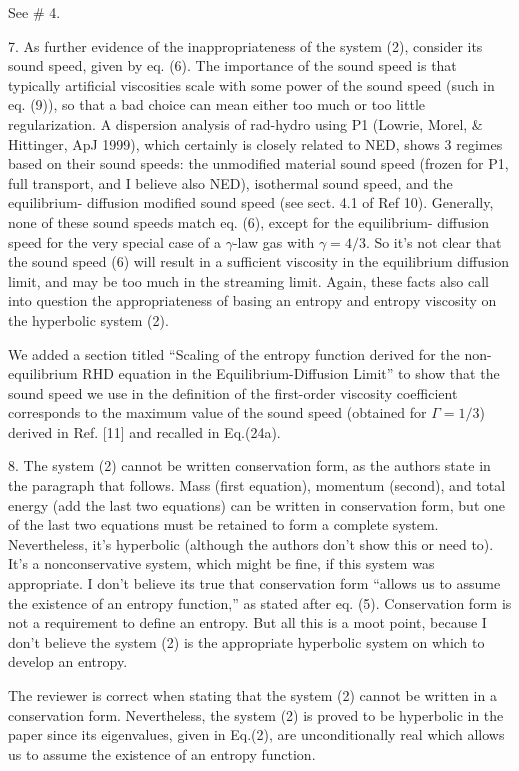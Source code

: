 \documentclass{article}
\begin{document}
See \# 4.
\bigskip


{
\color{blue}
7. As further evidence of the inappropriateness of the system (2), consider its sound speed, given by eq. (6). The importance of the sound speed is that typically artificial viscosities scale with some power of the sound speed (such in eq. (9)), so that a bad choice can mean either too much or too little regularization. A dispersion analysis of rad-hydro using P1 (Lowrie, Morel, \& Hittinger, ApJ 1999), which certainly is closely related to NED, shows 3 regimes based on their sound speeds: the unmodified material sound speed (frozen for P1, full transport, and I believe also NED), isothermal sound speed, and the equilibrium- diffusion modified sound speed (see sect. 4.1 of Ref 10). Generally, none of these sound speeds match eq. (6), except for the equilibrium- diffusion speed for the very special case of a $\gamma$-law gas with $\gamma = 4/3$. So it's not clear that the sound speed (6) will result in a sufficient viscosity in the equilibrium diffusion limit, and may be too much in the streaming limit. Again, these facts also call into question the appropriateness of basing an entropy and entropy viscosity on the hyperbolic system (2).
}

We added a section titled ``Scaling of the entropy function derived for the non-equilibrium RHD equation in the Equilibrium-Diffusion Limit''  to show that the sound speed we use in the definition of the first-order viscosity coefficient corresponds to the maximum value of the sound speed (obtained for $\Gamma = 1/3$) derived in Ref. [11] and recalled in Eq.(24a).
\bigskip


{
\color{blue}
8. The system (2) cannot be written conservation form, as the authors state in the paragraph that follows. Mass (first equation), momentum (second), and total energy (add the last two equations) can be written in conservation form, but one of the last two equations must be retained to form a complete system. Nevertheless, it's hyperbolic (although the authors don't show this or need to). It's a nonconservative system, which might be fine, if this system was appropriate. I don't believe its true that conservation form ``allows us to assume the existence of an entropy function,'' as stated after eq. (5). Conservation form is not a requirement to define an entropy. But all this is a moot point, because I don't believe the system (2) is the appropriate hyperbolic system on which to develop an entropy.
}

The reviewer is correct when stating that the system (2) cannot be written in a conservation form. Nevertheless, the system (2) is proved to be hyperbolic in the paper since its eigenvalues, given in Eq.(2), are unconditionally real which allows us to assume the existence of an entropy function.\\
\end{document}
